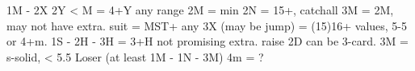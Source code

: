 1M - 2X
2Y < M = 4+Y any range
2M = min
2N = 15+, catchall
    3M = 2M, may not have extra. suit = MST+ 
any 3X (may be jump) = (15)16+ values, 5-5 or 4+m.
    1S - 2H - 3H = 3+H not promising extra. raise 2D can be 3-card.
3M = s-solid, < 5.5 Loser (at least 1M - 1N - 3M)
    4m = ?
